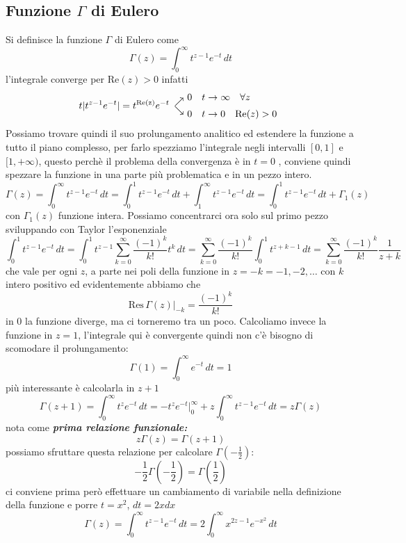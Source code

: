 \subsection{Funzione $\Gamma$ di Eulero}
Si definisce la funzione $\Gamma$ di Eulero come
\[\Gamma(z) =\int_0^\infty t^{z-1}e^{-t}\,dt\]
l'integrale converge per $\text{Re}(z)>0$ infatti 
\[t|t^{z-1}e^{-t}| = t^{\text{Re(z)}}e^{-t} \begin{array}{l@{\ }l}
    \raisebox{-1ex}{$\nearrow$} & 0 \quad  t\to \infty \quad \forall z \\
    \raisebox{1ex}{$\searrow$}  & 0\quad t\to 0\quad\text{Re}(z)>0
  \end{array}
\]
Possiamo trovare quindi il suo prolungamento analitico ed estendere la funzione a tutto il piano complesso, per farlo spezziamo l'integrale negli intervalli $[0,1]$ e $[1,+\infty)$, questo perchè il problema della convergenza è in $t=0$ , conviene quindi spezzare la funzione in una parte più problematica e in un pezzo intero.
\[\Gamma(z) =\int_0^\infty t^{z-1}e^{-t}\,dt = \int_0^1 t^{z-1}e^{-t}\,dt+\int_1^\infty t^{z-1}e^{-t}\,dt= \int_0^1 t^{z-1}e^{-t}\,dt+\Gamma_1(z)\]
con $\Gamma_1(z)$ funzione intera. Possiamo concentrarci ora solo sul primo pezzo sviluppando con Taylor l'esponenziale
\[\int_0^1 t^{z-1}e^{-t}\,dt = \int_0^1 t^{z-1}\sum_{k=0}^\infty \frac{(-1)^k}{k!}t^k\,dt = \sum_{k=0}^\infty \frac{(-1)^k}{k!}\int_0^1 t^{z+k-1}\,dt = \sum_{k=0}^\infty \frac{(-1)^k}{k!} \frac{1}{z+k} \]
che vale per ogni $z$, a parte nei poli della funzione in $z=-k=-1,-2,\dots$ con $k$ intero positivo ed evidentemente abbiamo che
\[\text{Res}\,\Gamma(z)\Big|_{-k} = \frac{(-1)^k}{k!}\]
in 0 la funzione diverge, ma ci torneremo tra un poco. Calcoliamo invece la funzione in $z=1$, l'integrale qui è convergente quindi non c'è bisogno di scomodare il prolungamento:
\[\Gamma(1) = \int_0^\infty e^{-t}\, dt = 1\]
più interessante è calcolarla in $z+1$
\[\Gamma(z+1) = \int_0^\infty t^{z}e^{-t}\,dt = -t^ze^{-t}\Big|_{0}^\infty + z\int_0^\infty t^{z-1}e^{-t}\, dt = z\Gamma(z)\]
nota come \emph{\textbf{prima relazione funzionale:}}
\[z\Gamma(z) = \Gamma(z+1)\]
possiamo sfruttare questa relazione per calcolare $\Gamma(-\frac{1}{2})$:
\[-\frac{1}{2}\Gamma\left(-\frac{1}{2}\right) = \Gamma\left(\frac{1}{2}\right)\]
ci conviene prima però effettuare un cambiamento di variabile nella definizione della funzione e porre $t=x^2$, $dt=2xdx$
\begin{equation}\label{eq:gamma}\Gamma(z) = \int_0^\infty t^{z-1}e^{-t}\,dt = 2\int_0^\infty x^{2z-1}e^{-x^2}\,dt\end{equation}
